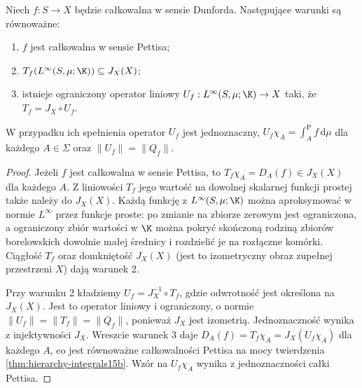 \begin{twierdzenie}
\label{thm:pettis-integration-operator15b}
Niech $f:S\to X$ będzie całkowalna w sensie Dunforda.
Następujące warunki są równoważne:
\begin{enumerate}
 \item $f$ jest całkowalna w sensie Pettisa;
 \item $T_f(L^\infty(S,\mu;\K))\subseteq J_X(X)$;
 \item istnieje ograniczony operator liniowy
 $U_f:L^\infty(S,\mu;\K)\to X$ taki, że $T_f=J_X\circ U_f$.
\end{enumerate}
W przypadku ich spełnienia operator $U_f$ jest jednoznaczny,
$U_f\chi_A=\int_A^{\mathrm P} f\,\mathrm d\mu$ dla każdego
$A\in\Sigma$ oraz $\|U_f\|=\|Q_f\|$.
\end{twierdzenie}
\begin{proof}
Jeżeli $f$ jest całkowalna w sensie Pettisa, to
$T_f\chi_A=D_A(f)\in J_X(X)$ dla każdego $A$.
Z liniowości $T_f$ jego wartość na dowolnej
skalarnej funkcji prostej także należy do $J_X(X)$.
Każdą funkcję z $L^\infty(S,\mu;\K)$ można
aproksymować w normie $L^\infty$ przez funkcje proste:
po zmianie na zbiorze zerowym jest ograniczona,
a ograniczony zbiór wartości w $\K$ można pokryć
skończoną rodziną zbiorów borelowskich dowolnie małej
średnicy i rozdzielić je na rozłączne komórki.
Ciągłość $T_f$ oraz domkniętość $J_X(X)$ (jest to
izometryczny obraz zupełnej przestrzeni $X$)
dają warunek 2.

Przy warunku 2 kładziemy $U_f=J_X^{-1}\circ T_f$,
gdzie odwrotność jest określona na $J_X(X)$.
Jest to operator liniowy i ograniczony, o normie
$\|U_f\|=\|T_f\|=\|Q_f\|$, ponieważ $J_X$ jest izometrią.
Jednoznaczność wynika z injektywności $J_X$.
Wreszcie warunek 3 daje
$D_A(f)=T_f\chi_A=J_X(U_f\chi_A)$ dla każdego $A$,
co jest równoważne całkowalności Pettisa na mocy
twierdzenia \ref{thm:hierarchy-integrals15b}.
Wzór na $U_f\chi_A$ wynika z jednoznaczności całki Pettisa.
\end{proof}

